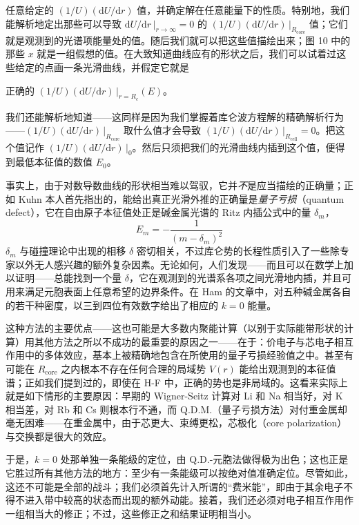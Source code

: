 
任意给定的 $(1/U)(\mathrm{d}U/\mathrm{d}r)$ 值，并确定解在任意能量下的性质。特别地，我们能解析地定出那些可以导致 $\mathrm{d}U/\mathrm{d}r\,\big|_{r\to\infty}=0$ 的 $(1/U)(\mathrm{d}U/\mathrm{d}r)\,\big|_{R_{\mathrm{core}}}$ 值；它们就是观测到的光谱项能量处的值。随后我们就可以把这些值描绘出来；图 10 中的那些 $x$ 就是一组假想的值。在大致知道曲线应有的形状之后，我们可以试着过这些给定的点画一条光滑曲线，并假定它就是

正确的 $(1/U)(\mathrm{d}U/\mathrm{d}r)\,\big|_{r=R_c}(E)$。

我们还能解析地知道——这同样是因为我们掌握着库仑波方程解的精确解析行为——$(1/U)(\mathrm{d}U/\mathrm{d}r)\,\big|_{R_{\mathrm{core}}}$ 取什么值才会导致 $(1/U)(\mathrm{d}U/\mathrm{d}r)\,\big|_{R_{\mathrm{cell}}}=0$。把这个值记作 $(1/U)(\mathrm{d}U/\mathrm{d}r)\,\big|_0$。然后只须把我们的光滑曲线内插到这个值，便得到最低本征值的数值 $E_0$。

事实上，由于对数导数曲线的形状相当难以驾驭，它并\emph{不}是应当描绘的正确量；正如 Kuhn 本人首先指出的，能给出真正光滑外推的正确量是\emph{量子亏损}（quantum defect），它在自由原子本征值处正是碱金属光谱的 Ritz 内插公式中的量 $\delta_m$，
\begin{equation*}
E_m=-\frac{1}{(m-\delta_m)^2}
\end{equation*}
$\delta_m$ 与碰撞理论中出现的相移 $\delta$ 密切相关，不过库仑势的长程性质引入了一些除专家以外无人感兴趣的额外复杂因素。无论如何，人们发现——而且可以在数学上加以证明——总能找到一个量 $\delta$，它在观测到的光谱系各项之间光滑地内插，并且可用来满足元胞表面上任意希望的边界条件。在 Ham 的文章中，对五种碱金属各自的若干种密度，以三到四位有效数字给出了相应的 $k=0$ 能量。

这种方法的主要优点——这也可能是大多数内聚能计算（以别于实际能带形状的计算）用其他方法之所以不成功的最重要的原因之一——在于：价电子与芯电子相互作用中的多体效应，基本上被精确地包含在所使用的量子亏损经验值之中。甚至有可能在 $R_{\mathrm{core}}$ 之内根本不存在任何合理的局域势 $V(r)$ 能给出观测到的本征值谱；正如我们提到过的，即使在 H-F 中，正确的势也是非局域的。这看来实际上就是如下情形的主要原因：早期的 Wigner-Seitz 计算对 Li 和 Na 相当好，对 K 相当差，对 Rb 和 Cs 则根本行不通，而 Q.D.M.（量子亏损方法）对付重金属却毫无困难——在重金属中，由于芯更大、束缚更松，芯极化（core polarization）与交换都是很大的效应。

于是，$k=0$ 处那单独一条能级的定位，由 Q.D.-元胞法做得极为出色；这也正是它胜过所有其他方法的地方：至少有一条能级可以按绝对值准确定位。尽管如此，这还不可能是全部的战斗；我们必须首先计入所谓的“费米能”，即由于其余电子不得不进入带中较高的状态而出现的额外动能。接着，我们还必须对电子相互作用作一组相当大的修正；不过，这些修正之和结果证明相当小。

